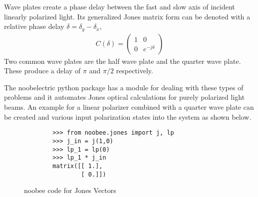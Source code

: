 Wave plates create a phase delay between the fast and slow axis of incident linearly polarized light.  Its generalized Jones matrix form can be denoted with a relative phase delay $\delta=\delta_y-\delta_x$,
\begin{align}
    C(\delta) =
    \begin{pmatrix}
        1 & 0 \\
        0 & e^{-j\delta}
    \end{pmatrix}
\end{align}
%
Two common wave plates are the half wave plate and the quarter wave plate.  These produce a delay of $\pi$ and $\pi/2$ respectively.

The noobelectric python package has a module for dealing with these types of problems and it automates Jones optical calculations for purely polarized light beams.  An example for a linear polarizer combined with a quarter wave plate can be created and various input polarization states into the system as shown below.
\begin{figure}
    \begin{lstlisting}
        >>> from noobee.jones import j, lp
        >>> j_in = j(1,0)
        >>> lp_1 = lp(0)
        >>> lp_1 * j_in
        matrix([[ 1.],
                [ 0.]])
    \end{lstlisting}
    \caption{noobee code for Jones Vectors}
    \label{fig:scattering}
\end{figure}
